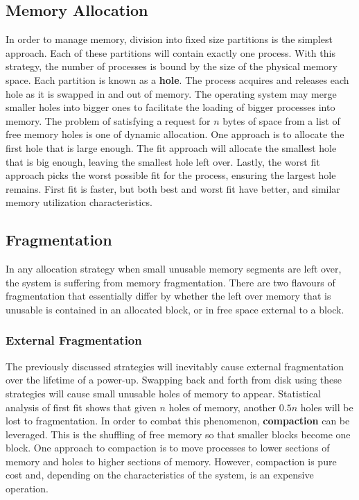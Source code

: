 \documentclass[10pt,a4paper]{article}
\begin{document}
\subsection{Memory Allocation}
In order to manage memory, division into fixed size partitions is the simplest approach. Each of these partitions will contain exactly one process. With this strategy, the number of processes is bound by the size of the physical memory space. Each partition is known as a {\bf hole}. The process acquires and releases each hole as it is swapped in and out of memory. The operating system may merge smaller holes into bigger ones to facilitate the loading of bigger processes into memory. The problem of satisfying a request for $n$ bytes of space from a list of free memory holes is one of dynamic allocation. One approach is to allocate the first hole that is large enough. The {\best fit} approach will allocate the smallest hole that is big enough, leaving the smallest hole left over. Lastly, the worst fit approach picks the worst possible fit for the process, ensuring the largest hole remains. First fit is faster, but both best and worst fit have better, and similar memory utilization characteristics. 
\subsection{Fragmentation}
In any allocation strategy when small unusable memory segments are left over, the system is suffering from memory fragmentation. There are two flavours of fragmentation that essentially differ by whether the left over memory that is unusable is contained in an allocated block, or in free space external to a block. 
\subsubsection{External Fragmentation}
The previously discussed strategies will inevitably cause external fragmentation over the lifetime of a power-up. Swapping back and forth from disk using these strategies will cause small unusable holes of memory to appear. Statistical analysis of first fit shows that given $n$ holes of memory, another $0.5n$ holes will be lost to fragmentation. In order to combat this phenomenon, {\bf compaction} can be leveraged. This is the shuffling of free memory so that smaller blocks become one block. One approach to compaction is to move processes to lower sections of memory and holes to higher sections of memory. However, compaction is pure cost and, depending on the characteristics of the system, is an expensive operation. 
\end{document}
